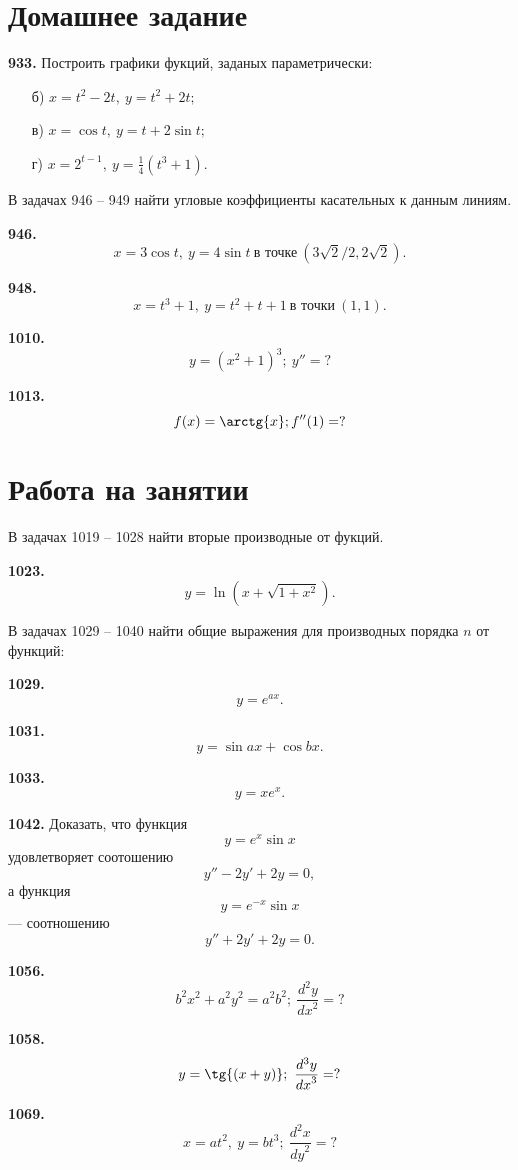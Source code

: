 \documentclass[a4paper,10pt]{article}
\newcommand{\exercize}[1]{\textbf{#1.}}
\begin{document}
\section{Домашнее задание}

\exercize{933} Построить графики фукций, заданых параметрически:
\begin{itemize}
\item[б)] $x = t^2 - 2 t,\ y = t^2 + 2 t;$
\item[в)] $x = \cos{t},\ y = t + 2 \sin{t};$
\item[г)] $x = 2^{t - 1},\ y = \frac{1}{4}(t^3 + 1).$
\end{itemize}

В задачах 946 -- 949 найти угловые коэффициенты касательных к данным линиям.

\exercize{946} \[ x = 3 \cos{t},\ y = 4 \sin{t} \ \textrm{в точке}\ (3 \sqrt{2}/2, 2 \sqrt{2}). \]

\exercize{948} \[ x = t^3 + 1,\ y = t^2 + t + 1 \ \textrm{в точки}\ (1, 1). \]

\exercize{1010} \[ y = (x^2 + 1)^3;\ y'' = ? \]

\exercize{1013} \[ f(x) = \arctg{x}; f''(1) = ? \]


\section{Работа на занятии}

В задачах 1019 -- 1028 найти вторые производные от фукций.

\exercize{1023} \[ y = \ln(x + \sqrt{1 + x^2}). \]

В задачах 1029 -- 1040 найти общие выражения для производных порядка $n$ от функций:

\exercize{1029} \[ y = e^{a x}. \]

\exercize{1031} \[ y = \sin{a x} + \cos{b x}. \]

\exercize{1033} \[ y = x e^x. \]

\exercize{1042} Доказать, что функция 
\[ y = e^x \sin{x} \]
удовлетворяет соотошению
\[ y'' - 2 y' + 2y = 0, \]
а функция 
\[ y = e^{-x} \sin{x} \]
--- соотношению
\[ y'' + 2 y' + 2y = 0. \]

\exercize{1056} \[ b^2 x^2 + a^2 y^2 = a^2 b^2;\ \frac{d^2 y}{{dx}^2} = ? \]

\exercize{1058} \[ y = \tg{(x + y)};\ \frac{d^3 y}{{dx}^3} = ? \]

\exercize{1069} \[ x = a t^2,\ y = b t^3;\ \frac{d^2 x}{{dy}^2} = ? \]
\end{document}
